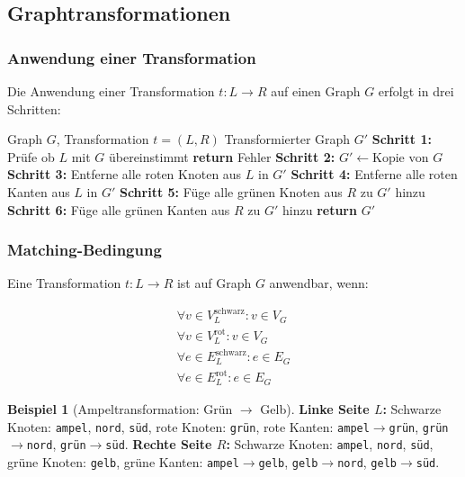 \documentclass[a4paper,12pt]{article}
\theoremstyle{definition}
\newtheorem{beispiel}{Beispiel}
\begin{document}
\subsection{Graphtransformationen}

\subsubsection{Anwendung einer Transformation}

Die Anwendung einer Transformation $t: L \rightarrow R$ auf einen Graph $G$ erfolgt in drei Schritten:

\begin{algorithm}[H]
	\caption{Anwendung einer Graphtransformation}
	\begin{algorithmic}[1]
		\Require Graph $G$, Transformation $t = (L, R)$
		\Ensure Transformierter Graph $G'$
		\State \textbf{Schritt 1:} Prüfe ob $L$ mit $G$ übereinstimmt
		\State \textbf{return} Fehler
		\EndIf
		\State \textbf{Schritt 2:} $G' \gets \text{Kopie von } G$
		\State \textbf{Schritt 3:} Entferne alle roten Knoten aus $L$ in $G'$
		\State \textbf{Schritt 4:} Entferne alle roten Kanten aus $L$ in $G'$
		\State \textbf{Schritt 5:} Füge alle grünen Knoten aus $R$ zu $G'$ hinzu
		\State \textbf{Schritt 6:} Füge alle grünen Kanten aus $R$ zu $G'$ hinzu
		\State \textbf{return} $G'$
	\end{algorithmic}
\end{algorithm}

\subsubsection{Matching-Bedingung}

Eine Transformation $t: L \rightarrow R$ ist auf Graph $G$ anwendbar, wenn:

\begin{align}
	\forall v \in V_L^{\text{schwarz}}: v \in V_G \\
	\forall v \in V_L^{\text{rot}}: v \in V_G \\
	\forall e \in E_L^{\text{schwarz}}: e \in E_G \\
	\forall e \in E_L^{\text{rot}}: e \in E_G
\end{align}

\begin{beispiel}[Ampeltransformation: Grün $\rightarrow$ Gelb]
	
	\textbf{Linke Seite $L$:} Schwarze Knoten: \texttt{ampel}, \texttt{nord}, \texttt{süd}, rote Knoten: \texttt{grün}, rote Kanten: \texttt{ampel}$\rightarrow$\texttt{grün}, \texttt{grün}$\rightarrow$\texttt{nord}, \texttt{grün}$\rightarrow$\texttt{süd}. \textbf{Rechte Seite $R$:} Schwarze Knoten: \texttt{ampel}, \texttt{nord}, \texttt{süd}, grüne Knoten: \texttt{gelb}, grüne Kanten: \texttt{ampel}$\rightarrow$\texttt{gelb}, \texttt{gelb}$\rightarrow$\texttt{nord}, \texttt{gelb}$\rightarrow$\texttt{süd}.
\end{beispiel}
\end{document}
